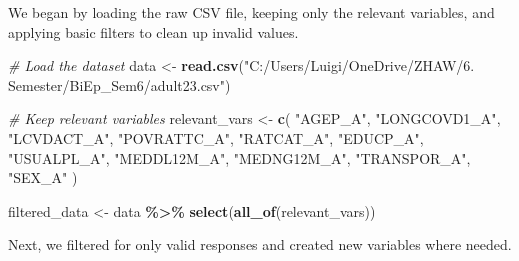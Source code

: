 \documentclass[
]{article}
\newenvironment{Shaded}{\begin{snugshade}}{\end{snugshade}}
\newcommand{\CommentTok}[1]{\textcolor[rgb]{0.56,0.35,0.01}{\textit{#1}}}
\newcommand{\FunctionTok}[1]{\textcolor[rgb]{0.13,0.29,0.53}{\textbf{#1}}}
\newcommand{\NormalTok}[1]{#1}
\newcommand{\OtherTok}[1]{\textcolor[rgb]{0.56,0.35,0.01}{#1}}
\newcommand{\SpecialCharTok}[1]{\textcolor[rgb]{0.81,0.36,0.00}{\textbf{#1}}}
\newcommand{\StringTok}[1]{\textcolor[rgb]{0.31,0.60,0.02}{#1}}
\begin{document}
We began by loading the raw CSV file, keeping only the relevant
variables, and applying basic filters to clean up invalid values.

\begin{Shaded}
\begin{Highlighting}[]
\CommentTok{\# Load the dataset}
\NormalTok{data }\OtherTok{\textless{}{-}} \FunctionTok{read.csv}\NormalTok{(}\StringTok{"C:/Users/Luigi/OneDrive/ZHAW/6. Semester/BiEp\_Sem6/adult23.csv"}\NormalTok{)}

\CommentTok{\# Keep relevant variables}
\NormalTok{relevant\_vars }\OtherTok{\textless{}{-}} \FunctionTok{c}\NormalTok{(}
  \StringTok{"AGEP\_A"}\NormalTok{, }\StringTok{"LONGCOVD1\_A"}\NormalTok{, }\StringTok{"LCVDACT\_A"}\NormalTok{, }\StringTok{"POVRATTC\_A"}\NormalTok{, }\StringTok{"RATCAT\_A"}\NormalTok{,}
  \StringTok{"EDUCP\_A"}\NormalTok{, }\StringTok{"USUALPL\_A"}\NormalTok{, }\StringTok{"MEDDL12M\_A"}\NormalTok{, }\StringTok{"MEDNG12M\_A"}\NormalTok{, }\StringTok{"TRANSPOR\_A"}\NormalTok{, }\StringTok{"SEX\_A"}
\NormalTok{)}

\NormalTok{filtered\_data }\OtherTok{\textless{}{-}}\NormalTok{ data }\SpecialCharTok{\%\textgreater{}\%}
  \FunctionTok{select}\NormalTok{(}\FunctionTok{all\_of}\NormalTok{(relevant\_vars))}
\end{Highlighting}
\end{Shaded}

Next, we filtered for only valid responses and created new variables
where needed.
\end{document}
